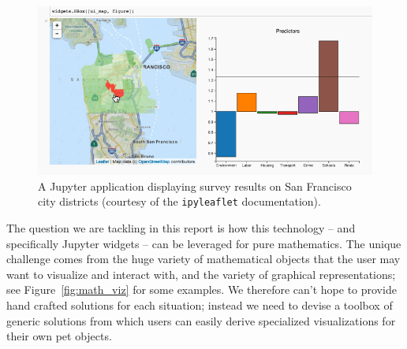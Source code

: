 \documentclass{deliverablereport}
\begin{document}
\begin{figure}[h]
  \begin{center}
    \includegraphics[width=\textwidth]{images/sc-ipyleaflet}
    \caption{A Jupyter application displaying survey results on San
      Francisco city districts \tiny{(courtesy of the \lstinline{ipyleaflet} documentation)}.}
  \label{fig:ipyleaflet2}
  \end{center}
\end{figure}

The question we are tackling in this report is how this technology --
and specifically Jupyter widgets -- can be leveraged for pure
mathematics. The unique challenge comes from the huge variety of
mathematical objects that the user may want to visualize and
interact with, and the variety of graphical representations;
see Figure~\ref{fig:math_viz} for some examples.
%
We therefore can't hope to provide hand crafted solutions for each
situation; instead we need to devise a toolbox of generic solutions
from which users can easily derive specialized visualizations for
their own pet objects.

\end{document}
